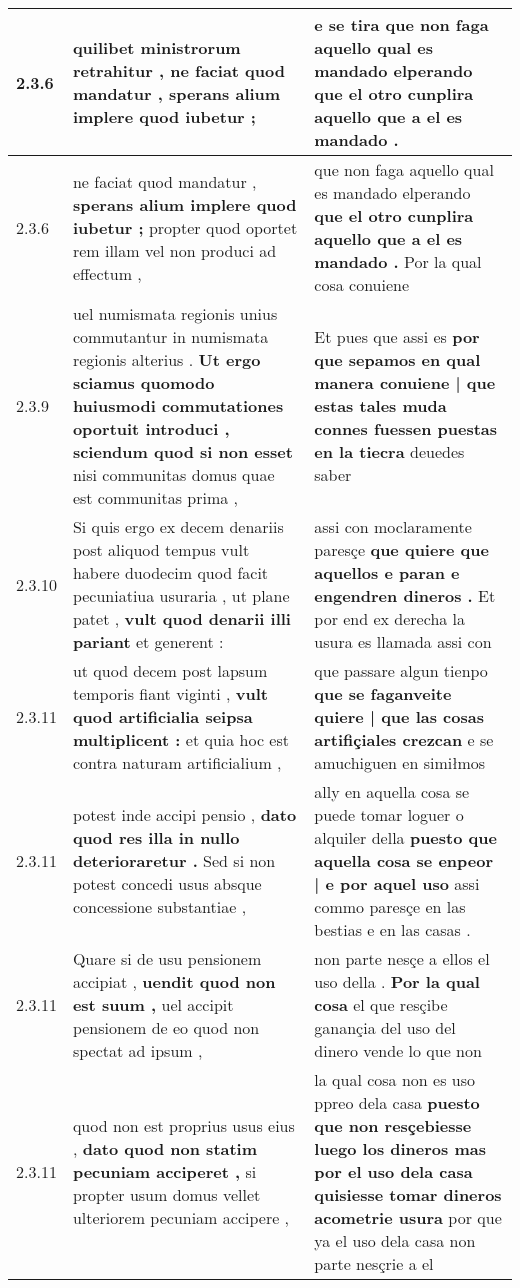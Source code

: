 \begin{tabular}{|p{1cm}|p{6.5cm}|p{6.5cm}|}
2.3.6 & quilibet ministrorum retrahitur , \textbf{ ne faciat quod mandatur , } sperans alium implere quod iubetur ; & e se tira \textbf{ que non faga aquello qual es mandado elperando } que el otro cunplira aquello que a el es mandado . \\\hline
2.3.6 & ne faciat quod mandatur , \textbf{ sperans alium implere quod iubetur ; } propter quod oportet rem illam vel non produci ad effectum , & que non faga aquello qual es mandado elperando \textbf{ que el otro cunplira aquello que a el es mandado . } Por la qual cosa conuiene \\\hline
2.3.9 & uel numismata regionis unius commutantur in numismata regionis alterius . \textbf{ Ut ergo sciamus quomodo huiusmodi commutationes oportuit introduci , sciendum quod si non esset } nisi communitas domus quae est communitas prima , & Et pues que assi es \textbf{ por que sepamos en qual manera conuiene | que estas tales muda connes fuessen puestas en la tiecra } deuedes saber \\\hline
2.3.10 & Si quis ergo ex decem denariis post aliquod tempus vult habere duodecim quod facit pecuniatiua usuraria , ut plane patet , \textbf{ vult quod denarii illi pariant } et generent : & assi con moclaramente paresçe \textbf{ que quiere que aquellos e paran e engendren dineros . } Et por end ex derecha la usura es llamada assi con \\\hline
2.3.11 & ut quod decem post lapsum temporis fiant viginti , \textbf{ vult quod artificialia seipsa multiplicent : } et quia hoc est contra naturam artificialium , & que passare algun tienpo \textbf{ que se faganveite quiere | que las cosas artifiçiales crezcan } e se amuchiguen en simiłmos \\\hline
2.3.11 & potest inde accipi pensio , \textbf{ dato quod res illa in nullo deterioraretur . } Sed si non potest concedi usus absque concessione substantiae , & ally en aquella cosa se puede tomar loguer o alquiler della \textbf{ puesto que aquella cosa se enpeor | e por aquel uso } assi commo paresçe en las bestias e en las casas . \\\hline
2.3.11 & Quare si de usu pensionem accipiat , \textbf{ uendit quod non est suum , } uel accipit pensionem de eo quod non spectat ad ipsum , & non parte nesçe a ellos el uso della . \textbf{ Por la qual cosa } el que resçibe ganançia del uso del dinero vende lo que non \\\hline
2.3.11 & quod non est proprius usus eius , \textbf{ dato quod non statim pecuniam acciperet , } si propter usum domus vellet ulteriorem pecuniam accipere , & la qual cosa non es uso ppreo dela casa \textbf{ puesto que non resçebiesse luego los dineros mas por el uso dela casa quisiesse tomar dineros acometrie usura } por que ya el uso dela casa non parte nesçrie a el \\\hline

\end{tabular}
